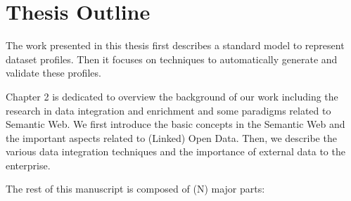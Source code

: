 \section{Thesis Outline} \label{sec:outline}
The work presented in this thesis first describes a standard model to represent dataset profiles. Then it focuses on techniques to automatically generate and validate these profiles.

Chapter 2 is dedicated to overview the background of our work including the research in data integration and enrichment and some paradigms related to Semantic Web. We first introduce the basic concepts in the Semantic Web and the important aspects related to (Linked) Open Data. Then, we describe the various data integration techniques and the importance of external data to the enterprise.

The rest of this manuscript is composed of (N) major parts: